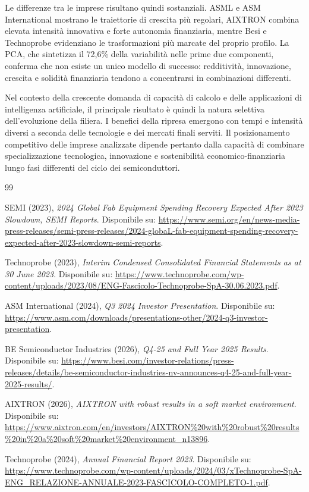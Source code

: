 \documentclass[11pt,a4paper]{article}
\begin{document}
Le differenze tra le imprese risultano quindi sostanziali. ASML e ASM International mostrano le traiettorie di crescita più regolari, AIXTRON combina elevata intensità innovativa e forte autonomia finanziaria, mentre Besi e Technoprobe evidenziano le trasformazioni più marcate del proprio profilo. La PCA, che sintetizza il 72,6\% della variabilità nelle prime due componenti, conferma che non esiste un unico modello di successo: redditività, innovazione, crescita e solidità finanziaria tendono a concentrarsi in combinazioni differenti.

Nel contesto della crescente domanda di capacità di calcolo e delle applicazioni di intelligenza artificiale, il principale risultato è quindi la natura selettiva dell'evoluzione della filiera. I benefici della ripresa emergono con tempi e intensità diversi a seconda delle tecnologie e dei mercati finali serviti. Il posizionamento competitivo delle imprese analizzate dipende pertanto dalla capacità di combinare specializzazione tecnologica, innovazione e sostenibilità economico-finanziaria lungo fasi differenti del ciclo dei semiconduttori.

\begin{thebibliography}{99}
\small

SEMI (2023), \textit{2024 Global Fab Equipment Spending Recovery Expected After 2023 Slowdown, SEMI Reports}. Disponibile su: \url{https://www.semi.org/en/news-media-press-releases/semi-press-releases/2024-globaL-fab-equipment-spending-recovery-expected-after-2023-slowdown-semi-reports}.

Technoprobe (2023), \textit{Interim Condensed Consolidated Financial Statements as at 30 June 2023}. Disponibile su: \url{https://www.technoprobe.com/wp-content/uploads/2023/08/ENG-Fascicolo-Technoprobe-SpA-30.06.2023.pdf}.

ASM International (2024), \textit{Q3 2024 Investor Presentation}. Disponibile su: \url{https://www.asm.com/downloads/presentations-other/2024-q3-investor-presentation}.

BE Semiconductor Industries (2026), \textit{Q4-25 and Full Year 2025 Results}. Disponibile su: \url{https://www.besi.com/investor-relations/press-releases/details/be-semiconductor-industries-nv-announces-q4-25-and-full-year-2025-results/}.

AIXTRON (2026), \textit{AIXTRON with robust results in a soft market environment}. Disponibile su: \url{https://www.aixtron.com/en/investors/AIXTRON%20with%20robust%20results%20in%20a%20soft%20market%20environment_n13896}.

Technoprobe (2024), \textit{Annual Financial Report 2023}. Disponibile su: \url{https://www.technoprobe.com/wp-content/uploads/2024/03/xTechnoprobe-SpA-ENG_RELAZIONE-ANNUALE-2023-FASCICOLO-COMPLETO-1.pdf}.

\end{thebibliography}
\end{document}

